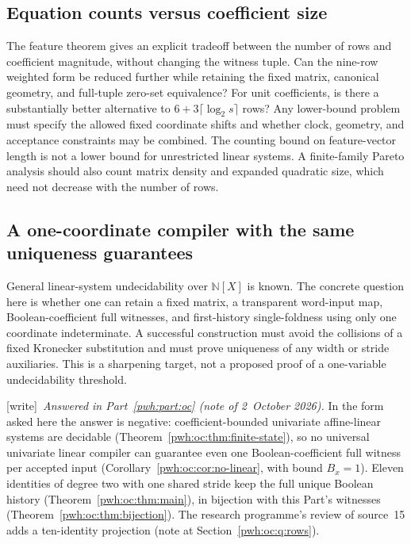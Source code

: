 \documentclass[11pt,letterpaper]{article}
\numberwithin{equation}{section}
\theoremstyle{definition}
\newcommand{\N}{\mathbb N}
\newcommand{\wtag}{\textup{[write]}}
\begin{document}
\subsection{Equation counts versus coefficient size}

The feature theorem gives an explicit tradeoff between the number of rows
and coefficient magnitude, without changing the witness tuple. Can the
nine-row weighted form be reduced further while retaining the fixed matrix,
canonical geometry, and full-tuple zero-set equivalence? For unit
coefficients, is there a substantially better alternative to
$6+3\lceil\log_2s\rceil$ rows? Any lower-bound problem must specify the
allowed fixed coordinate shifts and whether clock, geometry, and acceptance
constraints may be combined. The counting bound on feature-vector length
is not a lower bound for unrestricted linear systems. A finite-family
Pareto analysis should also count matrix density and expanded quadratic
size, which need not decrease with the number of rows.

\subsection{A one-coordinate compiler with the same uniqueness guarantees}\label{pwh:uh:q:onecoord}

General linear-system undecidability over $\N[X]$ is known. The concrete
question here is whether one can retain a fixed matrix, a transparent
word-input map, Boolean-coefficient full witnesses, and first-history
single-foldness using only one coordinate indeterminate. A successful
construction must avoid the collisions of a fixed Kronecker substitution
and must prove uniqueness of any width or stride auxiliaries. This is a
sharpening target, not a proposed proof of a one-variable undecidability
threshold.

\wtag\ \emph{Answered in Part~\ref{pwh:part:oc} (note of 2~October 2026).}
In the form asked here the answer is negative: coefficient-bounded
univariate affine-linear systems are decidable
(Theorem~\ref{pwh:oc:thm:finite-state}), so no universal univariate linear
compiler can guarantee even one Boolean-coefficient full witness per
accepted input (Corollary~\ref{pwh:oc:cor:no-linear}, with bound $B_x=1$).
Eleven identities of degree two with one shared stride keep the full unique
Boolean history (Theorem~\ref{pwh:oc:thm:main}), in bijection with this
Part's witnesses (Theorem~\ref{pwh:oc:thm:bijection}). The research
programme's review of source~15 adds a ten-identity projection (note at
Section~\ref{pwh:oc:q:rows}).
\end{document}
